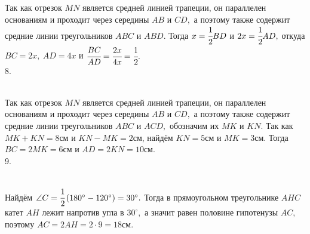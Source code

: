 \documentclass[12pt]{article}
\begin{document}
Так как отрезок $MN$ является средней линией трапеции, он параллелен основаниям и проходит через середины $AB$ и $CD,$ а поэтому также содержит средние линии треугольников $ABC$ и $ABD.$ Тогда $x=\cfrac{1}{2}BD$ и $2x=\cfrac{1}{2}AD,$ откуда $BC=2x,\ AD=4x$ и $\cfrac{BC}{AD}=\cfrac{2x}{4x}=\cfrac{1}{2}.$\\
8. \begin{figure}[ht!]
\end{figure}\\
Так как отрезок $MN$ является средней линией трапеции, он параллелен основаниям и проходит через середины $AB$ и $CD,$ а поэтому также содержит средние линии треугольников $ABC$ и $ACD,$ обозначим их $MK$ и $KN.$ Так как $MK+KN=8$см и $KN-MK=2$см, найдём $KN=5$см и $MK=3$см. Тогда $BC=2MK=6$см и $AD=2KN=10$см.\\
9. \begin{figure}[ht!]
\end{figure}\\
Найдём $\angle C=\cfrac{1}{2}\left(180^\circ-120^\circ\right)=30^\circ.$ Тогда в прямоугольном треугольнике $AHC$ катет $AH$ лежит напротив угла в $30^\circ,$ а значит равен половине гипотенузы $AC,$ поэтому $AC=2AH=2\cdot9=18$см.\\
\end{document}
